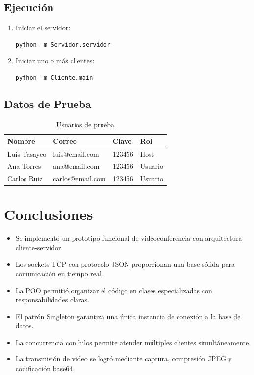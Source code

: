 \documentclass[12pt,a4paper]{article}
\begin{document}
\subsection{Ejecuci\'on}
\begin{enumerate}
    \item Iniciar el servidor:
    \begin{lstlisting}
python -m Servidor.servidor
    \end{lstlisting}
    \item Iniciar uno o m\'as clientes:
    \begin{lstlisting}
python -m Cliente.main
    \end{lstlisting}
\end{enumerate}

\subsection{Datos de Prueba}

\begin{table}[htbp]
    \centering
    \begin{tabular}{p{2.5cm}p{3cm}p{1.5cm}p{1.5cm}}
    \toprule
    \textbf{Nombre} & \textbf{Correo} & \textbf{Clave} & \textbf{Rol} \\
    \midrule
    Luis Tasayco  & luis@email.com   & 123456 & Host \\
    Ana Torres    & ana@email.com    & 123456 & Usuario \\
    Carlos Ruiz   & carlos@email.com & 123456 & Usuario \\
    \bottomrule
    \end{tabular}
    \caption{Usuarios de prueba}
\end{table}

\section{Conclusiones}

\begin{itemize}
    \item Se implement\'o un prototipo funcional de videoconferencia con arquitectura cliente-servidor.
    \item Los sockets TCP con protocolo JSON proporcionan una base s\'olida para comunicaci\'on en tiempo real.
    \item La POO permiti\'o organizar el c\'odigo en clases especializadas con responsabilidades claras.
    \item El patr\'on Singleton garantiza una \'unica instancia de conexi\'on a la base de datos.
    \item La concurrencia con hilos permite atender m\'ultiples clientes simult\'aneamente.
    \item La transmisi\'on de video se logr\'o mediante captura, compresi\'on JPEG y codificaci\'on base64.
\end{itemize}
\end{document}
